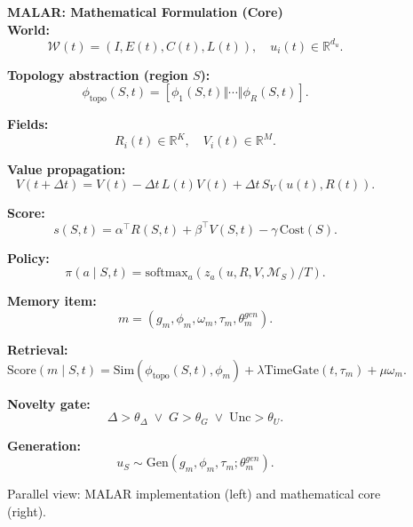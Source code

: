\documentclass[11pt,english]{article}
\theoremstyle{remark}
\newcommand{\W}{\mathcal{W}}
\newcommand{\M}{\mathcal{M}}
\newcommand{\phitopo}{\phi_{\mathrm{topo}}}
\newcommand{\Score}{\mathrm{Score}}
\newcommand{\Sim}{\mathrm{Sim}}
\newcommand{\TimeGate}{\mathrm{TimeGate}}
\newcommand{\Cost}{\mathrm{Cost}}
\newcommand{\Unc}{\mathrm{Unc}}
\newcommand{\Gen}{\mathrm{Gen}}
\begin{document}
\begin{figure}[t]
\begin{tcolorbox}[
		width=\textwidth,
		spread sidewards=-2.5cm,
		enhanced,
		colback=white,
		colframe=black,
		boxrule=1.0pt,
		arc=2mm,
		]
\begin{minipage}[t]{0.45\linewidth}
		\end{minipage}
		\hfill
		\begin{minipage}[t]{0.49\linewidth}
			\textbf{MALAR: Mathematical Formulation (Core)}\\[8pt]
			
			\textbf{World:}
			\[
			\W(t)=(I,E(t),C(t),L(t)),\quad u_i(t)\in\mathbb{R}^{d_u}.
			\]
			
			\textbf{Topology abstraction (region $S$):}
			\[
			\phitopo(S,t)=[\phi_1(S,t)\Vert\cdots\Vert\phi_R(S,t)].
			\]
			
			\textbf{Fields:}
			\[
			R_i(t)\in\mathbb{R}^K,\quad V_i(t)\in\mathbb{R}^M.
			\]
			
			\textbf{Value propagation:}
			\[
			V(t+\Delta t)=V(t)-\Delta t\,L(t)V(t)+\Delta t\,S_V(u(t),R(t)).
			\]
			
			\textbf{Score:}
			\[
			s(S,t)=\alpha^\top R(S,t)+\beta^\top V(S,t)-\gamma\,\Cost(S).
			\]
			
			\textbf{Policy:}
			\[
			\pi(a\mid S,t)=\mathrm{softmax}_a(z_a(u,R,V,\M_S)/T).
			\]
			
			\textbf{Memory item:}
			\[
			m=(g_m,\phi_m,\omega_m,\tau_m,\theta^{gen}_m).
			\]
			
			\textbf{Retrieval:}
			\[
			\Score(m\mid S,t)=\Sim(\phitopo(S,t),\phi_m)+\lambda\TimeGate(t,\tau_m)+\mu\omega_m.
			\]
			
			\textbf{Novelty gate:}
			\[
			\Delta>\theta_\Delta\;\vee\;G>\theta_G\;\vee\;\Unc>\theta_U.
			\]
			
			\textbf{Generation:}
			\[
			u_S\sim \Gen(g_m,\phi_m,\tau_m;\theta^{gen}_m).
			\]
			
		\end{minipage}
		
	\end{tcolorbox}
	
	\caption{Parallel view: MALAR implementation (left) and mathematical core (right).}
	\label{fig:malar-parallel}
\end{figure}

\newpage
\end{document}
